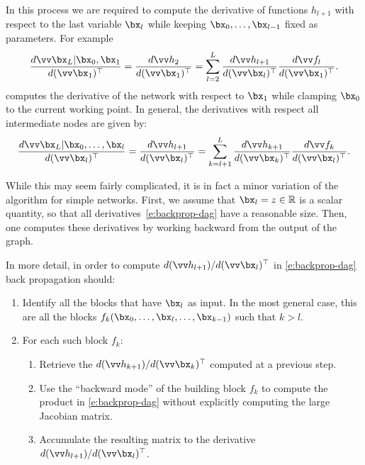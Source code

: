 In this process we are required to compute the derivative of functions $h_{l+1}$ with respect to the last variable $\bx_l$ while keeping $\bx_0,\dots,\bx_{l-1}$ fixed as parameters. For example
\[
\frac{d \vv \bx_L|\bx_0,\bx_1}{d(\vv \bx_1)^\top}
=
\frac{d \vv h_2}{d(\vv \bx_1)^\top}
=
\sum_{l=2}^L
\frac{d\vv h_{l+1}}{d(\vv \bx_l)^\top}
\frac{d\vv f_l}{d(\vv \bx_1)^\top}.
\]
computes the derivative of the network with respect to $\bx_1$ while clamping $\bx_0$ to the current working point. In general, the derivatives with respect all intermediate nodes are given by:
\begin{equation}\label{e:backprop-dag}
\frac{d \vv \bx_L|\bx_0,\dots,\bx_{l}}{d(\vv \bx_l)^\top}
=
\frac{d \vv h_{l+1}}{d(\vv \bx_l)^\top}
=
\sum_{k=l+1}^L
\frac{d\vv h_{k+1}}{d(\vv \bx_k)^\top}
\frac{d\vv f_k}{d(\vv \bx_l)^\top}.	
\end{equation}

While this may seem fairly complicated, it is in fact a minor variation of the algorithm for simple networks. First, we assume that $\bx_l = z \in \mathbb{R}$ is a scalar quantity, so that all derivatives~\eqref{e:backprop-dag} have a reasonable size. Then, one computes these derivatives by working backward from the output of the graph.

In more detail, in order to compute ${d (\vv h_{l+1})}/{d(\vv \bx_l)^\top}$ in \eqref{e:backprop-dag} back propagation should:
\begin{enumerate}
    \item Identify all the blocks that have $\bx_l$ as input. In the most general case, this are all the blocks $f_{k}(\bx_0,\dots,\bx_l,\dots,\bx_{k-1})$ such that $k > l$.
    \item For each such block $f_{k}$:
	\begin{enumerate}
	\item Retrieve the $d(\vv h_{k+1} )/d(\vv \bx_{k})^\top$ computed at a previous step.
	\item Use the ``backward mode'' of the building block $f_k$ to compute the product in \eqref{e:backprop-dag} without explicitly computing the large Jacobian matrix.
	\item Accumulate the resulting matrix to the derivative ${d (\vv h_{l+1})}/{d(\vv \bx_l)^\top}$.
	\end{enumerate}
\end{enumerate}


